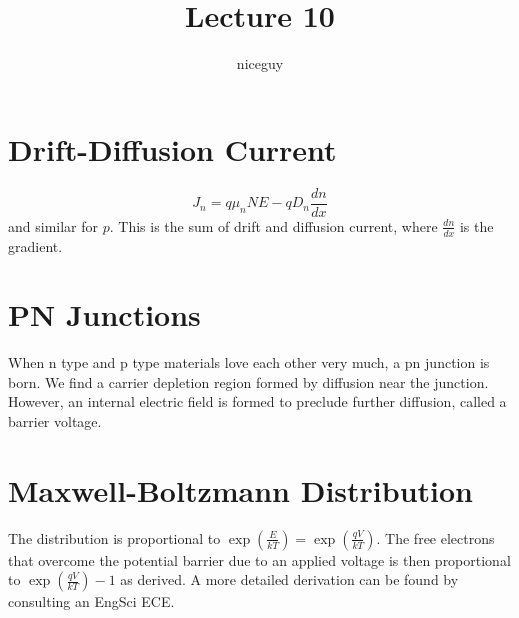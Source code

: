 \documentclass[12pt]{article}
\title{Lecture 10}
\author{niceguy}
\begin{document}
\maketitle

\section{Drift-Diffusion Current}

$$J_n = q\mu_nNE - qD_n\frac{dn}{dx}$$
and similar for $p$. This is the sum of drift and diffusion current, where $\frac{dn}{dx}$ is the gradient.

\section{PN Junctions}

When n type and p type materials love each other very much, a pn junction is born. We find a carrier depletion region formed by diffusion near the junction. However, an internal electric field is formed to preclude further diffusion, called a barrier voltage.

\section{Maxwell-Boltzmann Distribution}

The distribution is proportional to $\exp\left(\frac{E}{kT}\right) = \exp\left(\frac{qV}{kT}\right)$. The free electrons that overcome the potential barrier due to an applied voltage is then proportional to $\exp\left(\frac{qV}{kT}\right)-1$ as derived. A more detailed derivation can be found by consulting an EngSci ECE.
\end{document}
